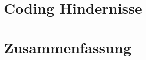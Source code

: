 \documentclass[ngerman]{seminarvorlage}
\begin{document}
\section{Coding Hindernisse} 
\section{Zusammenfassung}
\pagebreak

%
%


\end{document}
